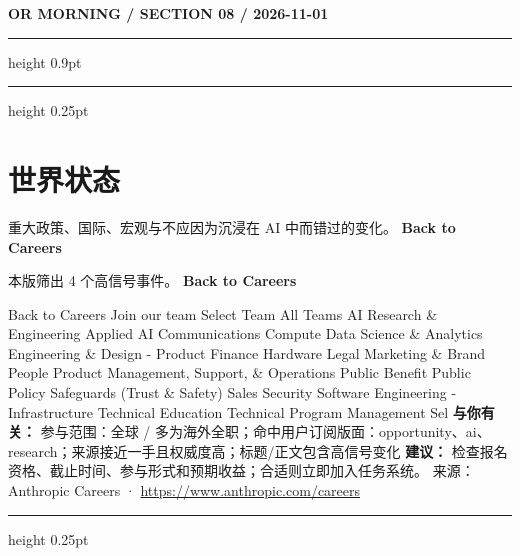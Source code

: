 \documentclass[10.5pt]{ctexart}
\begin{document}
\newpage
{\small\bfseries OR MORNING / SECTION 08 / 2026-11-01}
\vspace{2mm}
\hrule height 0.9pt
\vspace{1.5mm}
\hrule height 0.25pt
\vspace{4mm}
\section*{世界状态}
{\color{ormuted} 重大政策、国际、宏观与不应因为沉浸在 AI 中而错过的变化。}
\vspace{2mm}
{\LARGE\bfseries Back to Careers}\par
\vspace{1mm}
{\color{ormuted} 本版筛出 4 个高信号事件。}
\vspace{3mm}
{\Large\bfseries Back to Careers}\par
Back to Careers Join our team Select Team All Teams AI Research \& Engineering Applied AI Communications Compute Data Science \& Analytics Engineering \& Design - Product Finance Hardware Legal Marketing \& Brand People Product Management, Support, \& Operations Public Benefit Public Policy Safeguards (Trust \& Safety) Sales Security Software Engineering - Infrastructure Technical Education Technical Program Management Sel
\textbf{与你有关：} 参与范围：全球 / 多为海外全职；命中用户订阅版面：opportunity、ai、research；来源接近一手且权威度高；标题/正文包含高信号变化
\textbf{建议：} 检查报名资格、截止时间、参与形式和预期收益；合适则立即加入任务系统。
{\footnotesize\color{ormuted} 来源：Anthropic Careers · \url{https://www.anthropic.com/careers}}
\vspace{4mm}
\hrule height 0.25pt
\vspace{3mm}
\end{document}
